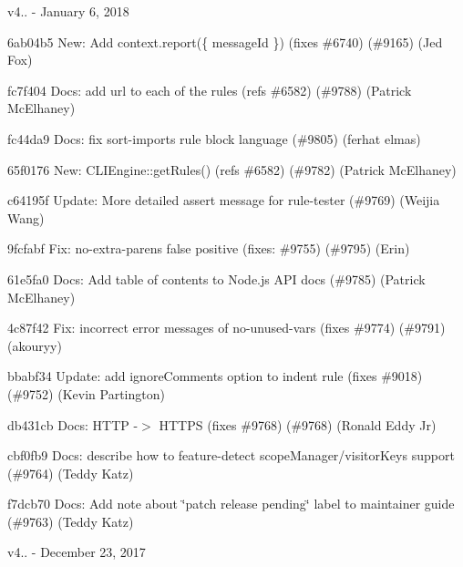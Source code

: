v4.. -\/ January 6, 2018


\begin{DoxyItemize}
\item 6ab04b5 New\+: Add context.\+report(\{ message\+Id \}) (fixes \#6740) (\#9165) (Jed Fox)
\item fc7f404 Docs\+: add url to each of the rules (refs \#6582) (\#9788) (Patrick Mc\+Elhaney)
\item fc44da9 Docs\+: fix sort-\/imports rule block language (\#9805) (ferhat elmas)
\item 65f0176 New\+: C\+L\+I\+Engine\+::get\+Rules() (refs \#6582) (\#9782) (Patrick Mc\+Elhaney)
\item c64195f Update\+: More detailed assert message for rule-\/tester (\#9769) (Weijia Wang)
\item 9fcfabf Fix\+: no-\/extra-\/parens false positive (fixes\+: \#9755) (\#9795) (Erin)
\item 61e5fa0 Docs\+: Add table of contents to Node.\+js A\+PI docs (\#9785) (Patrick Mc\+Elhaney)
\item 4c87f42 Fix\+: incorrect error messages of no-\/unused-\/vars (fixes \#9774) (\#9791) (akouryy)
\item bbabf34 Update\+: add {\ttfamily ignore\+Comments} option to {\ttfamily indent} rule (fixes \#9018) (\#9752) (Kevin Partington)
\item db431cb Docs\+: H\+T\+TP -\/$>$ H\+T\+T\+PS (fixes \#9768) (\#9768) (Ronald Eddy Jr)
\item cbf0fb9 Docs\+: describe how to feature-\/detect scope\+Manager/visitor\+Keys support (\#9764) (Teddy Katz)
\item f7dcb70 Docs\+: Add note about \char`\"{}patch release pending\char`\"{} label to maintainer guide (\#9763) (Teddy Katz)
\end{DoxyItemize}

v4.. -\/ December 23, 2017


